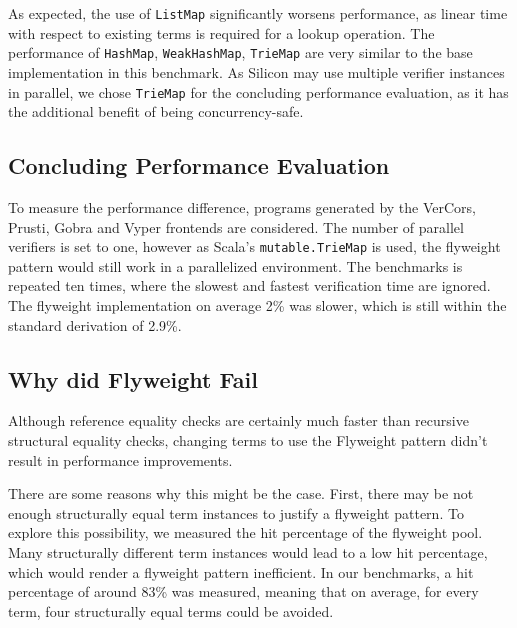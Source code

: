\documentclass[11pt]{article}
\begin{document}
    As expected, the use of \texttt{ListMap} significantly worsens performance,
    as linear time with respect to existing terms is required for a lookup operation.
    The performance of \texttt{HashMap}, \texttt{WeakHashMap}, \texttt{TrieMap}
    are very similar to the base implementation in this benchmark.
    As Silicon may use multiple verifier instances in parallel,
    we chose \texttt{TrieMap} for the concluding performance evaluation, as it has
    the additional benefit of being concurrency-safe. 

    \subsection{Concluding Performance Evaluation}

    To measure the performance difference, programs generated by the VerCors,
    Prusti, Gobra and Vyper frontends are considered. The number of parallel 
    verifiers is set to one, however as Scala's \texttt{mutable.TrieMap} is used,
    the flyweight pattern would still work in a parallelized environment. The benchmarks is repeated ten times, where the
    slowest and fastest verification time are ignored. The flyweight implementation on average 2\% was slower,
    which is still within the standard derivation of 2.9\%.




    \subsection{Why did Flyweight Fail}

    Although reference equality checks are certainly much faster than recursive structural equality
    checks, changing terms to use the Flyweight pattern didn't result in performance improvements.

    There are some reasons why this might be the case. First, there may be not enough structurally
    equal term instances to justify
    a flyweight pattern. To explore this possibility, we measured the hit percentage
    of the flyweight pool. Many structurally different term instances would lead to
    a low hit percentage, which would render a flyweight pattern inefficient. In our
    benchmarks, a hit percentage of around 83\% was measured, meaning that on average,
    for every term, four structurally equal terms could be avoided.
\end{document}
